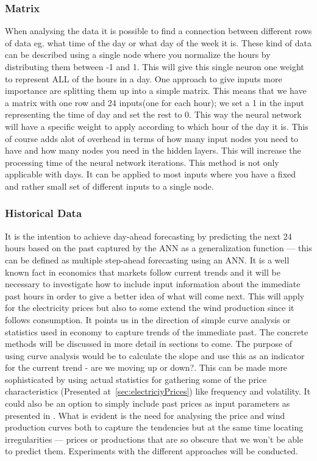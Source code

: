 \subsubsection{Matrix}
When analysing the data it is possible to find a connection between different rows of data eg. what time of the day or what day of the week it is. These kind of data can be described using a single node where you normalize the hours by distributing them between -1 and 1. This will give this single neuron one weight to represent ALL of the hours in a day. One approach to give inputs more importance are splitting them up into a simple matrix. This means that we have a matrix with one row and 24 inputs(one for each hour); we set a 1 in the input representing the time of day and set the rest to 0. This way the neural network will have a specific weight to apply according to which hour of the day it is. This of course adds alot of overhead in terms of how many input nodes you need to have and how many nodes you need in the hidden layers. This will increase the processing time of the neural network iterations. This method is not only applicable with days. It can be applied to most inputs where you have a fixed and rather small set of different inputs to a single node.

\subsubsection{Historical Data}
\label{sec:historicalData}
It is the intention to achieve day-ahead forecasting by predicting the next 24 hours based on the past captured by the ANN as a generalization function  --- this can be defined as multiple step-ahead forecasting using an ANN. 
It is a well known fact in economics that markets follow current trends  and it will be necessary to investigate how to include input information about the immediate past hours in order to give a better idea of what will come next. This will apply for the electricity prices but also to some extend the wind production since it follows consumption. It points us in the direction of simple curve analysis or statistics used in economy to capture trends of the immediate past. The concrete methods will be discussed in more detail in sections to come. The purpose of using curve analysis would be to calculate the slope and use this as an indicator for the current trend - are we moving up or down?. This can be made more sophisticated by using actual statistics for gathering some of the price characteristics (Presented at~\ref{sec:electriciyPrices}) like frequency and volatility. It could also be an option to simply include past prices as input parameters as presented in \cite{singhal2011electricity}.
What is evident is the need for analysing the price and wind production curves both to capture the tendencies but at the same time locating irregularities --- prices or productions that are so obscure that we won't be able to predict them. Experiments with the different approaches will be conducted.

